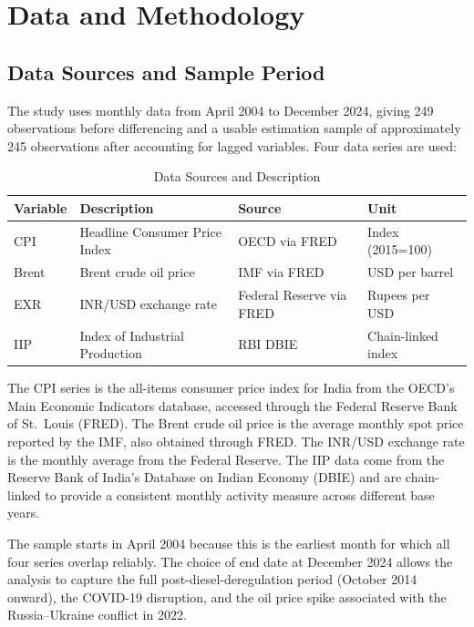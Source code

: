 \chapter{Data and Methodology}
\label{ch:data}

\section{Data Sources and Sample Period}

The study uses monthly data from April 2004 to December 2024, giving 249 observations before differencing and a usable estimation sample of approximately 245 observations after accounting for lagged variables. Four data series are used:

\begin{table}[H]
\centering
\caption{Data Sources and Description}
\label{tab:data_sources}
\begin{tabular}{llll}
\toprule
\textbf{Variable} & \textbf{Description} & \textbf{Source} & \textbf{Unit} \\
\midrule
CPI & Headline Consumer Price Index & OECD via FRED & Index (2015=100) \\
Brent & Brent crude oil price & IMF via FRED & USD per barrel \\
EXR & INR/USD exchange rate & Federal Reserve via FRED & Rupees per USD \\
IIP & Index of Industrial Production & RBI DBIE & Chain-linked index \\
\bottomrule
\end{tabular}
\end{table}

The CPI series is the all-items consumer price index for India from the OECD's Main Economic Indicators database, accessed through the Federal Reserve Bank of St.\ Louis (FRED). The Brent crude oil price is the average monthly spot price reported by the IMF, also obtained through FRED. The INR/USD exchange rate is the monthly average from the Federal Reserve. The IIP data come from the Reserve Bank of India's Database on Indian Economy (DBIE) and are chain-linked to provide a consistent monthly activity measure across different base years.

The sample starts in April 2004 because this is the earliest month for which all four series overlap reliably. The choice of end date at December 2024 allows the analysis to capture the full post-diesel-deregulation period (October 2014 onward), the COVID-19 disruption, and the oil price spike associated with the Russia--Ukraine conflict in 2022.

